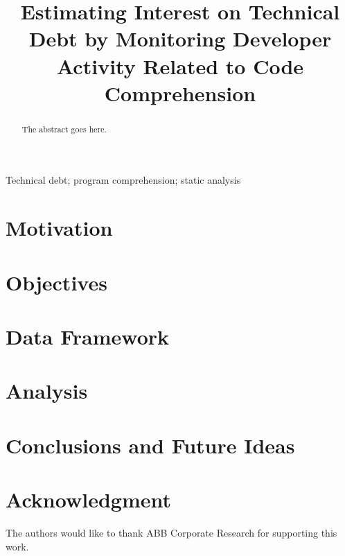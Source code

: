 \documentclass[conference]{IEEEtran}
\begin{document}
\title{Estimating Interest on Technical Debt by Monitoring Developer Activity Related to Code Comprehension}

\author{
\and
{}
}

\maketitle

\begin{abstract}
The abstract goes here.
\end{abstract}

\begin{IEEEkeywords}
Technical debt; program comprehension; static analysis
\end{IEEEkeywords}

\section{Motivation}


\section{Objectives}


\section{Data Framework}


\section{Analysis}


\section{Conclusions and Future Ideas}


\section*{Acknowledgment}
The authors would like to thank ABB Corporate Research for supporting this work.



\end{document}
